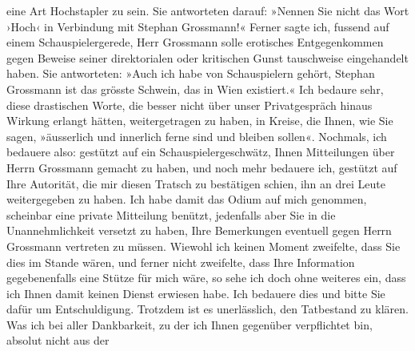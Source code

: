 \begin{ledgroupsized}[t]{13cm}
               eine Art Hochstapler zu sein. Sie antworteten darauf: »Nennen Sie nicht das Wort
               ›Hoch‹ in Verbindung mit Stephan Grossmann!«
               Ferner sagte ich, fussend auf einem Schauspielergerede, Herr Grossmann solle erotisches Entgegenkommen gegen Beweise seiner
               direktorialen oder kritischen Gunst tauschweise eingehandelt haben. Sie antworteten:
               »Auch ich habe von Schauspielern gehört, Stephan Grossmann ist das grösste Schwein, das in Wien existiert.« Ich bedaure sehr, diese drastischen Worte, die besser nicht
               über unser Privatgespräch hinaus Wirkung erlangt hätten, weitergetragen zu haben, in
               Kreise, die Ihnen, wie Sie sagen, »äusserlich und innerlich ferne sind und bleiben
               sollen«.\pend
           \pstart
           Nochmals, ich bedauere also: gestützt auf ein Schauspielergeschwätz, Ihnen
               Mitteilungen über Herrn Grossmann gemacht zu
               haben, und noch mehr bedauere ich, gestützt auf Ihre Autorität, die mir diesen
               Tratsch zu bestätigen schien, ihn an drei Leute weitergegeben zu haben. Ich habe
               damit das Odium auf mich genommen, scheinbar eine private Mitteilung benützt,
               jedenfalls aber Sie in die Unannehmlichkeit versetzt zu haben, Ihre Bemerkungen
               eventuell gegen Herrn Grossmann vertreten zu
               müssen. Wiewohl ich keinen Moment zweifelte, dass Sie dies im Stande wären, und
               ferner nicht zweifelte, dass Ihre Information gegebenenfalls eine Stütze für mich
               wäre, so sehe ich doch ohne weiteres ein, dass ich Ihnen damit keinen Dienst erwiesen
               habe. Ich bedauere dies und bitte Sie dafür um Entschuldigung. Trotzdem ist es un{\pb}erlässlich, den Tatbestand zu klären. Was ich bei
               aller Dankbarkeit, zu der ich Ihnen gegenüber verpflichtet bin, absolut nicht aus der

\end{ledgroupsized}
